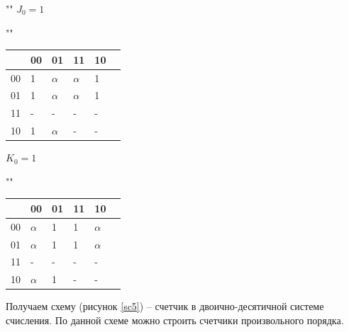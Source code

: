 \begin{center}
	""\newline\newline
	$J_{0} = 1$
	
	""\newline
	\begin{tabular}{ | l | l | l | l | l | p{1cm} |}
		\hline
		\diagbox[width=5em]{$q_{3}q_{2}$}{$q_{1}q_{0}$} & 00 & 01 & 11 & 10 \\\hline
		00 & \cellcolor{blue!25} 1 & \cellcolor{blue!25} $\alpha$ & \cellcolor{blue!25} $\alpha$ & \cellcolor{blue!25} 1  \\\hline
		01 & \cellcolor{blue!25} 1 & \cellcolor{blue!25} $\alpha$ & \cellcolor{blue!25} $\alpha$ & \cellcolor{blue!25} 1  \\\hline
		11 & \cellcolor{blue!25} - & \cellcolor{blue!25} -  & \cellcolor{blue!25} - & \cellcolor{blue!25} -  \\\hline
		10 & \cellcolor{blue!25} 1 & \cellcolor{blue!25} $\alpha$  & \cellcolor{blue!25} - & \cellcolor{blue!25} -  \\
		\hline
	\end{tabular}

	\clearpage
	$K_{0} = 1$
	
	""\newline
	\begin{tabular}{ | l | l | l | l | l | p{1cm} |}
		\hline
		\diagbox[width=5em]{$q_{3}q_{2}$}{$q_{1}q_{0}$} & 00 & 01 & 11 & 10 \\\hline
		00 & \cellcolor{blue!25} $\alpha$ & \cellcolor{blue!25} 1 & \cellcolor{blue!25} 1 & \cellcolor{blue!25} $\alpha$  \\\hline
		01 & \cellcolor{blue!25} $\alpha$ & \cellcolor{blue!25} 1 & \cellcolor{blue!25} 1 & \cellcolor{blue!25} $\alpha$  \\\hline
		11 & \cellcolor{blue!25}- & \cellcolor{blue!25}-  & \cellcolor{blue!25} - & \cellcolor{blue!25} -  \\\hline
		10 & \cellcolor{blue!25} $\alpha$ & \cellcolor{blue!25}1  & \cellcolor{blue!25} - & \cellcolor{blue!25} -  \\
		\hline
	\end{tabular}
\end{center}

Получаем схему (рисунок \ref{sc5}) -- счетчик в двоично-десятичной системе счисления. По данной схеме можно строить счетчики произвольного порядка.

